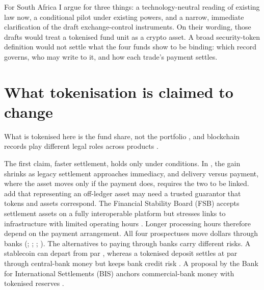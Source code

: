 \documentclass[12pt,a4paper]{article}
\begin{document}
For South Africa I argue for three things: a technology-neutral reading of existing law now, a conditional pilot under existing powers, and a narrow, immediate clarification of the draft exchange-control instruments. On their wording, those drafts would treat a tokenised fund unit as a crypto asset. A broad security-token definition would not settle what the four funds show to be binding: which record governs, who may write to it, and how each trade's payment settles.

\section{What tokenisation is claimed to change}\label{sec:lit}
What is tokenised here is the fund share, not the portfolio \citep[p.~10]{FSB2024}, and blockchain records play different legal roles across products \citep[pp.~10, 46, 64]{IOSCO2025}.

The first claim, faster settlement, holds only under conditions. In \citet[pp.~31, 42]{ChiuKoeppl2019}, the gain shrinks as legacy settlement approaches immediacy, and delivery versus payment, where the asset moves only if the payment does, requires the two to be linked. \citet[pp.~130--131]{BenosGarrattGurrolaPerez2019} add that representing an off-ledger asset may need a trusted guarantor that tokens and assets correspond. The Financial Stability Board (FSB) accepts settlement assets on a fully interoperable platform but stresses links to infrastructure with limited operating hours \citep[p.~13]{FSB2024}. Longer processing hours therefore depend on the payment arrangement. All four prospectuses move dollars through banks (\citealp[pp.~32--33, 37]{FranklinOnChain2026}; \citealp[p.~145]{WisdomTreeTMMDF2025}; \citealp[pp.~21, 26]{JPMorganOnChainLTMMF2026}; \citealp[Ways to Invest]{FidelityTDF2026}). The alternatives to paying through banks carry different risks. A stablecoin can depart from par \citep[p.~2]{GarrattShin2023}, whereas a tokenised deposit settles at par through central-bank money but keeps bank credit risk \citep[pp.~5--6]{GarrattShin2023}. A proposal by the Bank for International Settlements (BIS) anchors commercial-bank money with tokenised reserves \citep[pp.~79--81]{BIS2025}.
\end{document}
